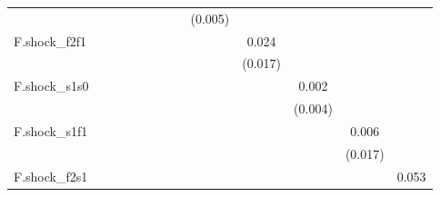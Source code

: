 {\begin{tabular}{l*{12}{c}}
            &                     &                     &                     &                     &                     &                     &                     &     (0.005)         &                     &                     &                     &                     \\
\addlinespace
F.shock\_f2f1&                     &                     &                     &                     &                     &                     &                     &                     &       0.024         &                     &                     &                     \\
            &                     &                     &                     &                     &                     &                     &                     &                     &     (0.017)         &                     &                     &                     \\
\addlinespace
F.shock\_s1s0&                     &                     &                     &                     &                     &                     &                     &                     &                     &       0.002         &                     &                     \\
            &                     &                     &                     &                     &                     &                     &                     &                     &                     &     (0.004)         &                     &                     \\
\addlinespace
F.shock\_s1f1&                     &                     &                     &                     &                     &                     &                     &                     &                     &                     &       0.006         &                     \\
            &                     &                     &                     &                     &                     &                     &                     &                     &                     &                     &     (0.017)         &                     \\
\addlinespace
F.shock\_f2s1&                     &                     &                     &                     &                     &                     &                     &                     &                     &                     &                     &       0.053\sym{**} \\

\end{tabular}}
